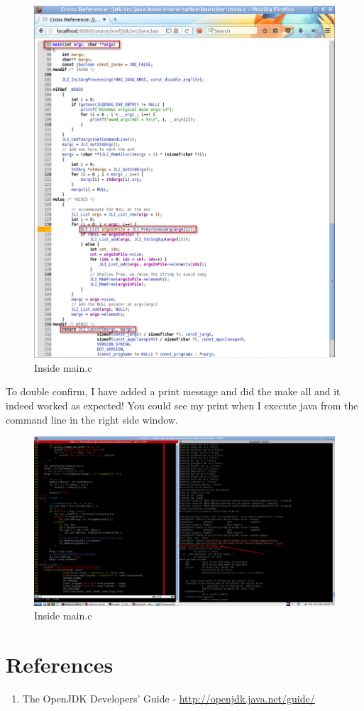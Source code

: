 \documentclass{article}
\begin{document}
\begin{figure}[H]
\centering
\includegraphics[width=\textwidth]{OpenJDK-7.png}
\caption{Inside main.c}
\end{figure}
To double confirm, I have added a print message and did the make all and it indeed worked as expected! You could see my print when I execute java from the command line in the right side window.
\begin{figure}[H]
\centering
\includegraphics[width=\textwidth]{OpenJDK-8.png}
\caption{Inside main.c}
\end{figure}
\section{References}
\begin{enumerate}[noitemsep]
\item The OpenJDK Developers' Guide - \url{http://openjdk.java.net/guide/}
\end{enumerate}
\end{document}
